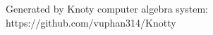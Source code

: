 \documentclass[letterpaper, 10pt]{extarticle}
\begin{document}
Generated by Knoty computer algebra system:
https://github.com/vuphan314/Knotty

\bigskip
\end{document}
